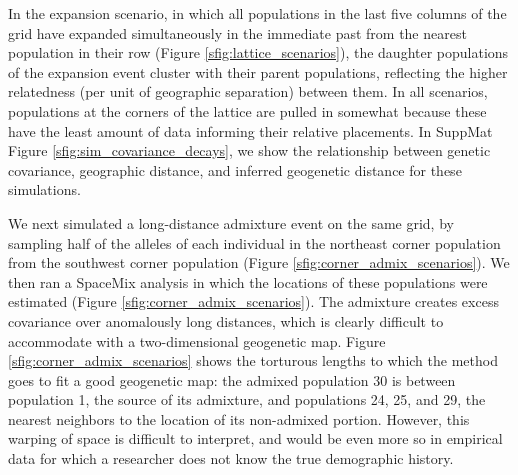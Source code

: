 \documentclass[12pt]{article}
\begin{document}
In the expansion scenario, in which all populations in the last five columns of the grid have expanded simultaneously in the immediate past from the nearest population in their row (Figure  \ref{sfig:lattice_scenarios}), 
the daughter populations of the expansion event cluster with their parent populations, reflecting the higher relatedness (per unit of geographic separation) between them.  
In all scenarios, populations at the corners of the lattice are pulled in somewhat
because these have the least amount of data informing their relative placements.
In SuppMat Figure \ref{sfig:sim_covariance_decays}, we show the relationship between genetic covariance, geographic distance, and inferred geogenetic distance for these simulations.

We next simulated a long-distance admixture event on the same grid,
by sampling half of the alleles of each individual in the northeast corner population from the southwest corner population (Figure  \ref{sfig:corner_admix_scenarios}).  We then ran a SpaceMix analysis in which the locations of these populations were estimated (Figure  \ref{sfig:corner_admix_scenarios}).
The admixture creates excess covariance over anomalously long distances, which is clearly difficult to accommodate with a two-dimensional geogenetic map.
Figure \ref{sfig:corner_admix_scenarios} shows the torturous lengths to which the method goes to fit a good geogenetic map: the admixed population 30 is between population 1, the source of its admixture, and populations 24, 25, and 29, the nearest neighbors to the location of its non-admixed portion.
However, this warping of space is difficult to interpret, and would be even more so in empirical data for which a researcher does not know the true demographic history.  
\end{document}
